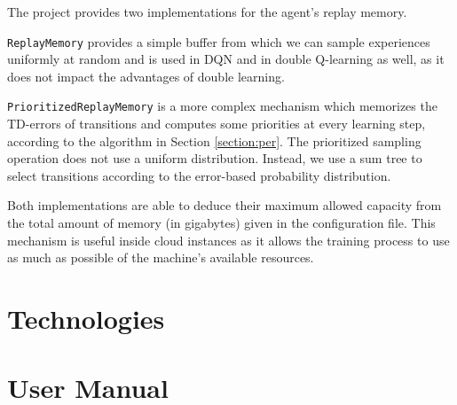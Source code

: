 The project provides two implementations for the agent’s replay memory.

\texttt{ReplayMemory} provides a simple buffer from which we can sample experiences uniformly at random and is used in DQN and in double Q-learning as well, as it does not impact the advantages of double learning.

\texttt{PrioritizedReplayMemory} is a more complex mechanism which memorizes the TD-errors of transitions and computes some priorities at every learning step, according to the algorithm in Section \ref{section:per}.
The prioritized sampling operation does not use a uniform distribution.
Instead, we use a sum tree to select transitions according to the error-based probability distribution.

Both implementations are able to deduce their maximum allowed capacity from the total amount of memory (in gigabytes) given in the configuration file.
This mechanism is useful inside cloud instances as it allows the training process to use as much as possible of the machine's available resources.

\section{Technologies} \label{section:technologies}

\section{User Manual} \label{section:user-manual}
